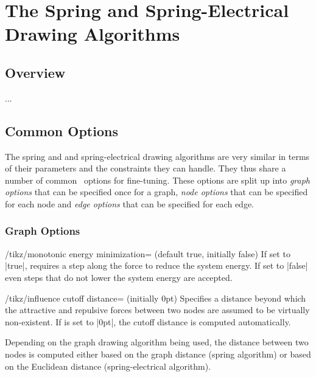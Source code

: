 \section{The Spring and Spring-Electrical Drawing Algorithms}

\subsection{Overview}


...

\subsection{Common Options}

The spring and and spring-electrical drawing algorithms are very similar
in terms of their parameters and the constraints they can handle. They
thus share a number of common \tikzname\ options for fine-tuning. These
options are split up into \emph{graph options} that can be specified
once for a graph, \emph{node options} that can be specified for each
node and \emph{edge options} that can be specified for each edge.

\subsubsection{Graph Options}

\begin{key}{/tikz/monotonic energy minimization= 
  (default true, initially false)}
  If set to |true|, requires a step along the force to reduce the
  system energy. If set to |false| even steps that do not lower the 
  system energy are accepted.
  \begin{codeexample}[]
  \end{codeexample}
\end{key}

\begin{key}{/tikz/influence cutoff distance= (initially
  0pt)}
  Specifies a distance beyond which the attractive and repulsive forces 
  between two nodes are assumed to be virtually non-existent. If 
   is set to |0pt|, the cutoff distance is computed 
  automatically.

  Depending on the graph drawing algorithm being used, the distance
  between two nodes is computed either based on the graph distance
  (spring algorithm) or based on the Euclidean distance
  (spring-electrical algorithm).
  \begin{codeexample}[]
  \end{codeexample}
\end{key}

